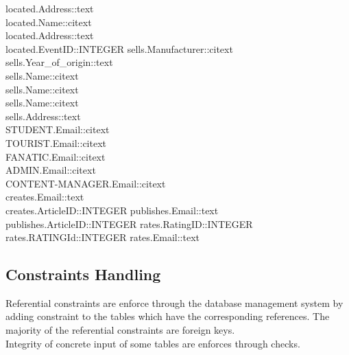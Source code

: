 located.Address::text\\
located.Name::citext\\
located.Address::text\\
located.EventID::INTEGER
sells.Manufacturer::citext\\
sells.Year\_of\_origin::text\\
sells.Name::citext\\
sells.Name::citext\\
sells.Name::citext\\
sells.Address::text\\
STUDENT.Email::citext\\
TOURIST.Email::citext\\
FANATIC.Email::citext\\
ADMIN.Email::citext\\
CONTENT-MANAGER.Email::citext\\
creates.Email::text\\
creates.ArticleID::INTEGER
publishes.Email::text\\
publishes.ArticleID::INTEGER
rates.RatingID::INTEGER
rates.RATINGId::INTEGER
rates.Email::text\\
\subsection{Constraints Handling}
Referential constraints are enforce through the database management system by adding constraint to the tables which have the corresponding references. The majority of the referential constraints are foreign keys.\\
Integrity of concrete input of some tables are enforces through checks.\\
\newpage
